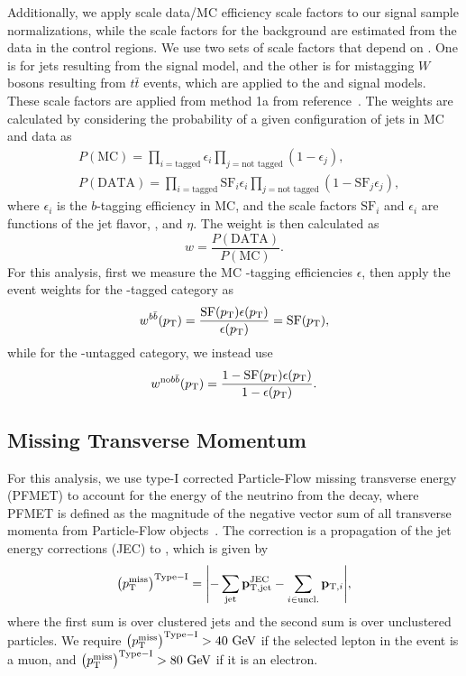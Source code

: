 Additionally, we apply scale data/MC efficiency scale factors to our signal sample normalizations, while the scale factors for the background are estimated from the data in the control regions.
We use two sets of scale factors that depend on \ptjet.
One is for \Htobbbar jets resulting from the \WprtoWHtolnubbbar signal model, and the other is for mistagging $W$ bosons resulting from $t\bar{t}$ events, which are applied to the \GBulktoWWtolnuqqbarpr and \WprtoWZtolnuqqbar signal models.
These scale factors are applied from method 1a from reference~\cite{bTaggingEff}.
The weights are calculated by considering the probability of a given configuration of jets in MC and data as
\begin{align}
  & P(\mathrm{MC})=\prod_{i=\text{tagged}}\epsilon_i\prod_{j=\text{not tagged}}(1-\epsilon_j),\\
  & P(\mathrm{DATA})=\prod_{i=\text{tagged}}\mathrm{SF}_i\epsilon_i\prod_{j=\text{not tagged}}(1-\mathrm{SF}_j\epsilon_j),
\end{align}
where $\epsilon_i$ is the $b$-tagging efficiency in MC, and the scale factors $\mathrm{SF}_i$ and $\epsilon_i$ are functions of the jet flavor, \pt, and $\eta$.
The weight is then calculated as
\begin{equation}
  w=\frac{P(\mathrm{DATA})}{P(\mathrm{MC})}.
\end{equation}
For this analysis, first we measure the MC \bbbar-tagging efficiencies $\epsilon$, then apply the event weights for the \bbbar-tagged category as
\begin{equation}
  w^{b\bar{b}}(p_\mathrm{T})=\frac{\mathrm{SF}(p_\mathrm{T})\epsilon(p_\mathrm{T})}{\epsilon(p_\mathrm{T})}=\mathrm{SF}(p_\mathrm{T}),
\end{equation}
while for the \bbbar-untagged category, we instead use
\begin{equation}
  w^{\mathrm{no}b\bar{b}}(p_\mathrm{T})=\frac{1-\mathrm{SF}(p_\mathrm{T})\epsilon(p_\mathrm{T})}{1-\epsilon(p_\mathrm{T})}.
\end{equation}

\subsection{Missing Transverse Momentum}

For this analysis, we use type-I corrected Particle-Flow missing transverse energy (PFMET) to account for the energy of the neutrino from the \Wlep decay, where PFMET is defined as the magnitude of the negative vector sum of all transverse momenta from Particle-Flow objects~\cite{Sirunyan:2019kia}. %
The correction is a propagation of the jet energy corrections (JEC) to \ptmiss, which is given by
\begin{equation}
  \ptmissTI=\vqty{-\sum_\mathrm{jet}\vb{p}_\mathrm{T,jet}^\mathrm{JEC}-\sum_{i\in\mathrm{uncl.}}\vb{p}_{\mathrm{T},i}},
\end{equation}
where the first sum is over clustered jets and the second sum is over unclustered particles.
We require $\ptmissTI>40\unit{GeV}$ if the selected lepton in the event is a muon, and $\ptmissTI>80\unit{GeV}$ if it is an electron.

